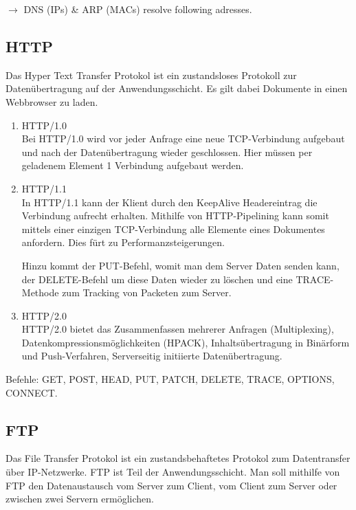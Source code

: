 \documentclass{scrartcl}
\begin{document}
    $\rightarrow$ DNS (IPs) \& ARP (MACs) resolve following adresses.
    
    \subsection{HTTP}
    Das Hyper Text Transfer Protokol ist ein zustandsloses Protokoll zur Datenübertragung auf der Anwendungsschicht. Es gilt dabei Dokumente in einen Webbrowser zu laden.
    \begin{enumerate}
        \item HTTP/1.0\\
        Bei HTTP/1.0 wird vor jeder Anfrage eine neue TCP-Verbindung aufgebaut und nach der Datenübertragung wieder geschlossen. Hier müssen per geladenem Element 1 Verbindung aufgebaut werden.
        \item HTTP/1.1\\
        In HTTP/1.1 kann der Klient durch den KeepAlive Headereintrag die Verbindung aufrecht erhalten. Mithilfe von HTTP-Pipelining kann somit mittels einer einzigen TCP-Verbindung alle Elemente eines Dokumentes anfordern. Dies fürt zu Performanzsteigerungen.
        
        Hinzu kommt der PUT-Befehl, womit man dem Server Daten senden kann, der DELETE-Befehl um diese Daten wieder zu löschen und eine TRACE-Methode zum Tracking von Packeten zum Server. 
        \item HTTP/2.0\\
        HTTP/2.0 bietet das Zusammenfassen mehrerer Anfragen (Multiplexing), Datenkompressionsmöglichkeiten (HPACK), Inhaltsübertragung in Binärform und Push-Verfahren, Serverseitig initiierte Datenübertragung.
    \end{enumerate}
    Befehle: GET, POST, HEAD, PUT, PATCH, DELETE, TRACE, OPTIONS, CONNECT.
    
    \subsection{FTP}
    Das File Transfer Protokol ist ein zustandsbehaftetes Protokol zum Datentransfer über IP-Netzwerke. FTP ist Teil der Anwendungsschicht.
    Man soll mithilfe von FTP den Datenaustausch vom Server zum Client, vom Client zum Server oder zwischen zwei Servern ermöglichen.
    
\end{document}
